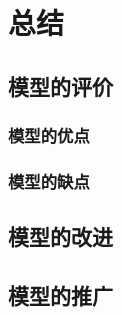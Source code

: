 \documentclass{cumcmthesis}
\begin{document}
\section{总结}
\subsection{模型的评价}
\subsubsection{模型的优点}
\subsubsection{模型的缺点}
\subsection{模型的改进}
\subsection{模型的推广}
\end{document}
